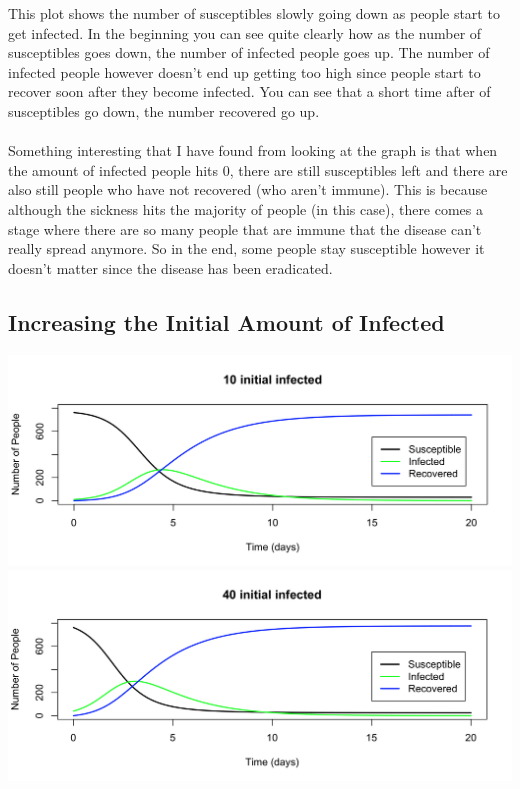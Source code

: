 \documentclass{article}
\begin{document}
        This plot shows the number of susceptibles slowly going down as people start to get infected. In the beginning you can see quite clearly how as the number of susceptibles goes down, the number of infected people goes up. The number of infected people however doesn't end up getting too high since people start to recover soon after they become infected. You can see that a short time after of susceptibles go down, the number recovered go up.
        \\
        \\
        Something interesting that I have found from looking at the graph is that when the amount of infected people hits 0, there are still susceptibles left and there are also still people who have not recovered (who aren't immune). This is because although the sickness hits the majority of people (in this case), there comes a stage where there are so many people that are immune that the disease can't really spread anymore. So in the end, some people stay susceptible however it doesn't matter since the disease has been eradicated.
    \subsection{Increasing the Initial Amount of Infected}
        \includegraphics[width=\textwidth,height=\textheight,keepaspectratio]{sir_initial_infected_10.png}
        \includegraphics[width=\textwidth,height=\textheight,keepaspectratio]{sir_initial_infected_40.png}
\end{document}
